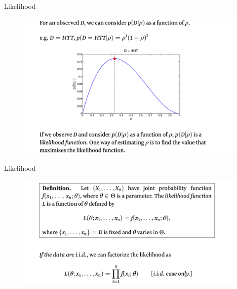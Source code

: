 \documentclass{beamer}
\begin{document}
\begin{frame}{Likelihood}

        \begin{figure}
                \includegraphics[width=\linewidth]{like7.png}
        \end{figure}

\end{frame}

\begin{frame}{Likelihood}

        \begin{figure}
                \includegraphics[width=\linewidth]{like8.png}
        \end{figure}

\end{frame}
\end{document}
